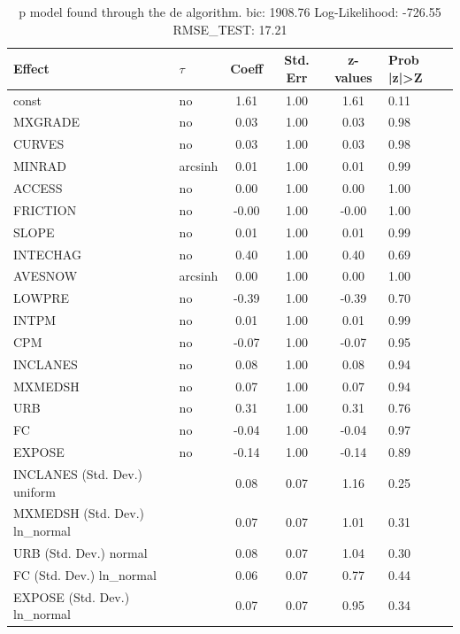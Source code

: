 \begin{table}
	\caption{p model found through the de algorithm. bic: 1908.76 Log-Likelihood: -726.55 RMSE_TEST: 17.21}
	\begin{center}
		\begin{tabular}{|l|l|c|c|c|l|}
			\hline
			Effect & $\tau$ & Coeff & Std. Err & z-values & Prob |z|>Z \\
			\hline
			const & no & 1.61 & 1.00 & 1.61 & 0.11 \\
			\hline
			MXGRADE & no & 0.03 & 1.00 & 0.03 & 0.98 \\
			\hline
			CURVES & no & 0.03 & 1.00 & 0.03 & 0.98 \\
			\hline
			MINRAD & arcsinh & 0.01 & 1.00 & 0.01 & 0.99 \\
			\hline
			ACCESS & no & 0.00 & 1.00 & 0.00 & 1.00 \\
			\hline
			FRICTION & no & -0.00 & 1.00 & -0.00 & 1.00 \\
			\hline
			SLOPE & no & 0.01 & 1.00 & 0.01 & 0.99 \\
			\hline
			INTECHAG & no & 0.40 & 1.00 & 0.40 & 0.69 \\
			\hline
			AVESNOW & arcsinh & 0.00 & 1.00 & 0.00 & 1.00 \\
			\hline
			LOWPRE & no & -0.39 & 1.00 & -0.39 & 0.70 \\
			\hline
			INTPM & no & 0.01 & 1.00 & 0.01 & 0.99 \\
			\hline
			CPM & no & -0.07 & 1.00 & -0.07 & 0.95 \\
			\hline
			INCLANES & no & 0.08 & 1.00 & 0.08 & 0.94 \\
			\hline
			MXMEDSH & no & 0.07 & 1.00 & 0.07 & 0.94 \\
			\hline
			URB & no & 0.31 & 1.00 & 0.31 & 0.76 \\
			\hline
			FC & no & -0.04 & 1.00 & -0.04 & 0.97 \\
			\hline
			EXPOSE & no & -0.14 & 1.00 & -0.14 & 0.89 \\
			\hline
			INCLANES (Std. Dev.) uniform &  & 0.08 & 0.07 & 1.16 & 0.25 \\
			\hline
			MXMEDSH (Std. Dev.) ln_normal &  & 0.07 & 0.07 & 1.01 & 0.31 \\
			\hline
			URB (Std. Dev.) normal &  & 0.08 & 0.07 & 1.04 & 0.30 \\
			\hline
			FC (Std. Dev.) ln_normal &  & 0.06 & 0.07 & 0.77 & 0.44 \\
			\hline
			EXPOSE (Std. Dev.) ln_normal &  & 0.07 & 0.07 & 0.95 & 0.34 \\
			\hline
		\end{tabular}
	\end{center}
\end{table}